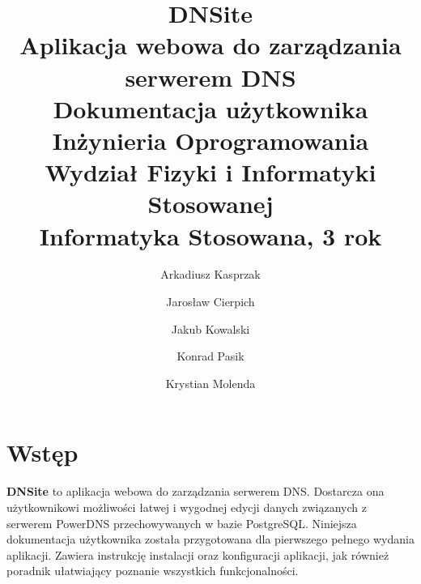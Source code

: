 \documentclass[12pt] {article}
\title 
{	
	{
		\textbf{\textsf{\Huge\color{orange}DNS\color{white}ite}} \\ [0.1in]
		\normalfont\sffamily\LARGE\color{white}
		Aplikacja webowa do zarządzania serwerem DNS \\[0.1in]
		Dokumentacja użytkownika\\ [1.5in]
		\large 
		Inżynieria Oprogramowania \\
		Wydział Fizyki i Informatyki Stosowanej \\
		Informatyka Stosowana, 3 rok \\
	}
}
\author 
{
	\color{white}\normalfont\sffamily Arkadiusz Kasprzak \and 
	\color{white}\normalfont\sffamily Jarosław Cierpich \and 
	\color{white}\normalfont\sffamily Jakub Kowalski \and 
	\color{white}\normalfont\sffamily Konrad Pasik \and 
	\color{white}\normalfont\sffamily Krystian Molenda
}
\date{}
\begin{document}
\pagecolor{backgroundColor}
\maketitle
\thispagestyle{empty}


\newpage
\clearpage
{}
\pagecolor{white}

\tableofcontents

\newpage 

\section{Wstęp}
\textbf{DNSite} to aplikacja webowa do zarządzania serwerem DNS. Dostarcza ona użytkownikowi możliwości łatwej i wygodnej edycji danych związanych z serwerem PowerDNS przechowywanych w bazie PostgreSQL.\newline
Niniejsza dokumentacja użytkownika została przygotowana dla pierwszego pełnego wydania aplikacji. Zawiera instrukcję instalacji oraz konfiguracji aplikacji, jak również poradnik ułatwiający poznanie wszystkich funkcjonalności.
\end{document}
